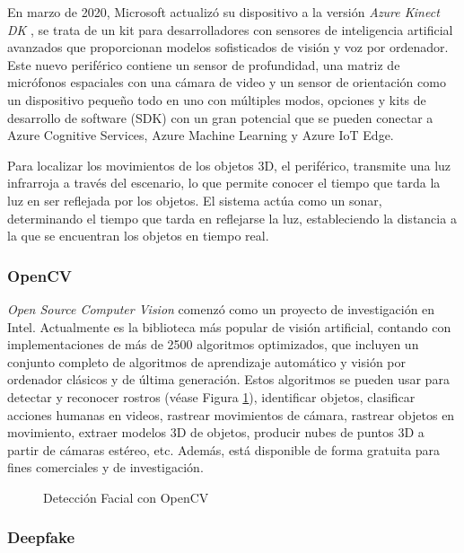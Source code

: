 En marzo de 2020, Microsoft actualizó su dispositivo a la versión \textit{Azure Kinect DK }\cite{AzureKinect}, se trata de un kit para desarrolladores con sensores de inteligencia artificial avanzados que proporcionan modelos sofisticados de visión y voz por ordenador. Este nuevo periférico contiene un sensor de profundidad, una matriz de micrófonos espaciales con una cámara de video y un sensor de orientación como un dispositivo pequeño todo en uno con múltiples modos, opciones y kits de desarrollo de software (SDK) con un gran potencial que se pueden conectar a Azure Cognitive Services, Azure Machine Learning y Azure IoT Edge.

Para localizar los movimientos de los objetos 3D, el periférico, transmite una luz infrarroja a través del escenario, lo que permite conocer el tiempo que tarda la luz en ser reflejada por los objetos. El sistema actúa como un sonar, determinando el tiempo que tarda en reflejarse la luz, estableciendo la distancia a la que se encuentran los objetos en tiempo real.


\subsubsection{OpenCV}
\label{cap3:sec:OpenCV}

\textit{Open Source Computer Vision}\cite{OpenCV} comenzó como un proyecto de investigación en Intel. Actualmente es la biblioteca más popular de visión artificial, contando con implementaciones de más de 2500 algoritmos optimizados, que incluyen un conjunto completo de algoritmos de aprendizaje automático y visión por ordenador clásicos y de última generación. Estos algoritmos se pueden usar para detectar y reconocer rostros (véase Figura \ref{fig:OpenCV}), identificar objetos, clasificar acciones humanas en videos, rastrear movimientos de cámara, rastrear objetos en movimiento, extraer modelos 3D de objetos, producir nubes de puntos 3D a partir de cámaras estéreo, etc. Además, está disponible de forma gratuita para fines comerciales y de investigación.

\begin{figure}[h!]
    \centering
    \caption{Detección Facial con OpenCV }
    \label{fig:OpenCV}  
\end{figure}

\subsubsection{Deepfake}

